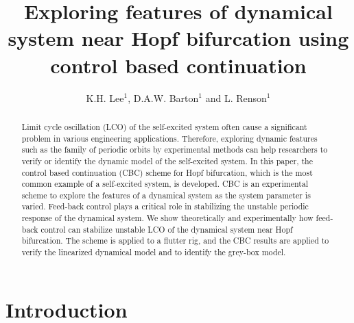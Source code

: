 \documentclass[openacc]{rsproca_new}%
\begin{document}



\title{Exploring features of dynamical system near Hopf bifurcation using control based continuation}

\author{%
K.H. Lee$^{1}$, D.A.W. Barton$^{1}$ and L. Renson$^{1}$}

\address{$^{1}$Department of Engineering Mathematics, University of Bristol\\}

\subject{mechanical engineering, differential equations}



\begin{abstract}
 Limit cycle oscillation (LCO) of the self-excited system often cause a significant problem in various engineering applications. Therefore, exploring dynamic features such as the family of periodic orbits by experimental methods can help researchers to verify or identify the dynamic model of the self-excited system. In this paper, the control based continuation (CBC) scheme for Hopf bifurcation, which is the most common example of a self-excited system, is developed. CBC is an experimental scheme to explore the features of a dynamical system as the system parameter is varied. Feed-back control plays a critical role in stabilizing the unstable periodic response of the dynamical system. We show theoretically and experimentally how feed-back control can stabilize unstable LCO of the dynamical system near Hopf bifurcation. The scheme is applied to a flutter rig, and the CBC results are applied to verify the linearized dynamical model and to identify the grey-box model.
\end{abstract}

\maketitle

\section{Introduction}\label{int}
\end{document}

